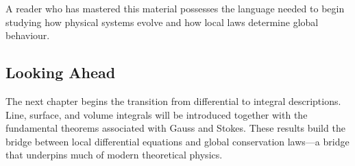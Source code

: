 A reader who has mastered this material possesses the language needed to begin
studying how physical systems evolve and how local laws determine global
behaviour.

\subsection*{Looking Ahead}

The next chapter begins the transition from differential to integral
descriptions. Line, surface, and volume integrals will be introduced together
with the fundamental theorems associated with Gauss and Stokes. These results
build the bridge between local differential equations and global conservation
laws---a bridge that underpins much of modern theoretical physics.
